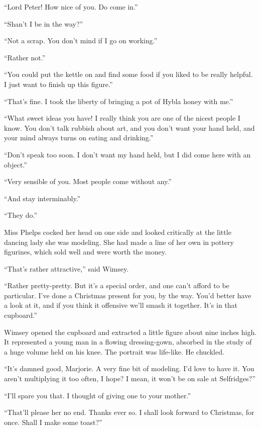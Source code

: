 \enquote{Lord Peter! How nice of you. Do come in.}

\enquote{Shan't I be in the way?}

\enquote{Not a scrap. You don't mind if I go on working.}

\enquote{Rather not.}

\enquote{You could put the kettle on and find some food if you liked to be really helpful. I just want to finish up this figure.}

\enquote{That's fine. I took the liberty of bringing a pot of Hybla honey with me.}

\enquote{What sweet ideas you have! I really think you are one of the nicest people I know. You don't talk rubbish about art, and you don't want your hand held, and your mind always turns on eating and drinking.}

\enquote{Don't speak too soon. I don't want my hand held, but I did come here with an object.}

\enquote{Very sensible of you. Most people come without any.}

\enquote{And stay interminably.}

\enquote{They do.}

Miss Phelps cocked her head on one side and looked critically at the little dancing lady she was modeling. She had made a line of her own in pottery figurines, which sold well and were worth the money.

\enquote{That's rather attractive,} said Wimsey.

\enquote{Rather pretty-pretty. But it's a special order, and one can't afford to be particular. I've done a Christmas present for you, by the way. You'd better have a look at it, and if you think it offensive we'll smash it together. It's in that cupboard.}

Wimsey opened the cupboard and extracted a little figure about nine inches high. It represented a young man in a flowing dressing-gown, absorbed in the study of a huge volume held on his knee. The portrait was life-like. He chuckled.

\enquote{It's damned good, Marjorie. A very fine bit of modeling. I'd love to have it. You aren't multiplying it too often, I hope? I mean, it won't be on sale at Selfridges?}

\enquote{I'll spare you that. I thought of giving one to your mother.}

\enquote{That'll please her no end. Thanks ever so. I shall look forward to Christmas, for once. Shall I make some toast?}

